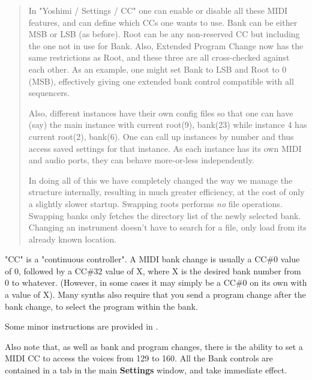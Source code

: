 \begin{quotation}
      In "Yoshimi / Settings / CC" one can enable or disable all these MIDI
      features, and can define which CCs one wants to use. Bank can be either
      MSB or LSB (as before). Root can be any non-reserved CC but including
      the one not in use for Bank. Also, Extended Program Change now has the
      same restrictions as Root, and these three are all cross-checked
      against each other. As an example, one might set Bank to LSB and Root
      to 0 (MSB), effectively giving one extended bank control compatible
      with all sequencers.

      Also, different instances have their own config files so that one can
      have (say) the main instance with current root(9), bank(23) while
      instance 4 has current root(2), bank(6). One can call up instances by
      number and thus access saved settings for that instance. As each
      instance has its own MIDI and audio ports, they can behave
      more-or-less independently.

      In doing all of this we have completely changed the way we manage the
      structure internally, resulting in much greater efficiency, at the
      cost of only a slightly slower startup. Swapping roots performs
      \textsl{no}
      file operations. Swapping banks only fetches the directory list of the
      newly selected bank. Changing an instrument doesn't have to search for
      a file, only load from its already known location.
   \end{quotation}

   "CC" is a "continuous controller".
   A MIDI bank change is usually a CC\#0 value of 0, followed by a CC\#32
   value of X, where X is the desired bank number from 0 to whatever.
   (However, in some cases it may simply be a CC\#0 on its own with a value
    of X).  Many synths also require that you send a program change after
   the bank change, to select the program within the bank. 


   Some minor instructions are provided in
   .

   Also note that, as well as bank and program changes, there is the ability
   to set a MIDI CC to access the voices from 129 to 160. All the Bank
   controls are contained in a tab in the main \textbf{Settings}
   window, and take immediate effect.

